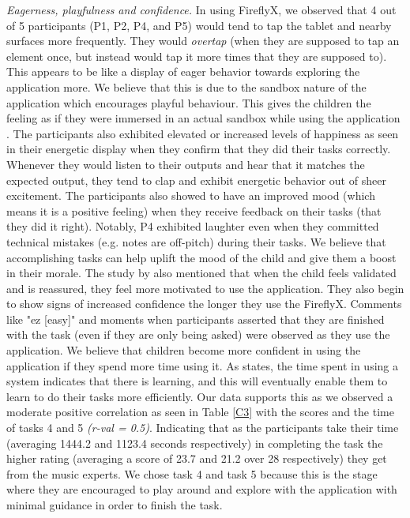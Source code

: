 \textit{Eagerness, playfulness and confidence.} In using FireflyX, we observed that 4 out of 5 participants (P1, P2, P4, and P5) would tend to tap the tablet and nearby surfaces more frequently. They would \textit{overtap} (when they are supposed to tap an element once, but instead would tap it more times that they are supposed to). This appears to be like a display of eager behavior towards exploring the application more. We believe that this is due to the sandbox nature of the application which encourages playful behaviour. This gives the children the feeling as if they were immersed in an actual sandbox while using the application \cite{inal2007flow}. The participants also exhibited elevated or increased levels of happiness as seen in their energetic display when they confirm that they did their tasks correctly.  Whenever they would listen to their outputs and hear that it matches the expected output, they tend to clap and exhibit energetic behavior out of sheer excitement. The participants also showed to have an improved mood (which means it is a positive feeling) when they receive feedback on their tasks (that they did it right). Notably, P4 exhibited laughter even when they committed technical mistakes (e.g. notes are off-pitch) during their tasks. We believe that accomplishing tasks can help uplift the mood of the child and give them a boost in their morale. The study by  also mentioned that when the child feels validated and is reassured, they feel more motivated to use the application. They also begin to show signs of increased confidence the longer they use the FireflyX. Comments like "ez [easy]" and moments when participants asserted that they are finished with the task (even if they are only being asked) were observed as they use the application. We believe that children become more confident in using the application if they spend more time using it. As  states, the time spent in using a system indicates that there is learning, and this will eventually enable them to learn to do their tasks more efficiently. Our data supports this as we observed a moderate positive correlation as seen in Table \ref{C3} with the scores and the time of tasks 4 and 5 \textit{(r-val = 0.5)}. Indicating that as the participants take their time (averaging 1444.2 and 1123.4 seconds respectively) in completing the task the higher rating (averaging a score of 23.7 and 21.2 over 28 respectively) they get from the music experts. We chose task 4 and task 5 because this is the stage where they are encouraged to play around and explore with the application with minimal guidance in order to finish the task.

